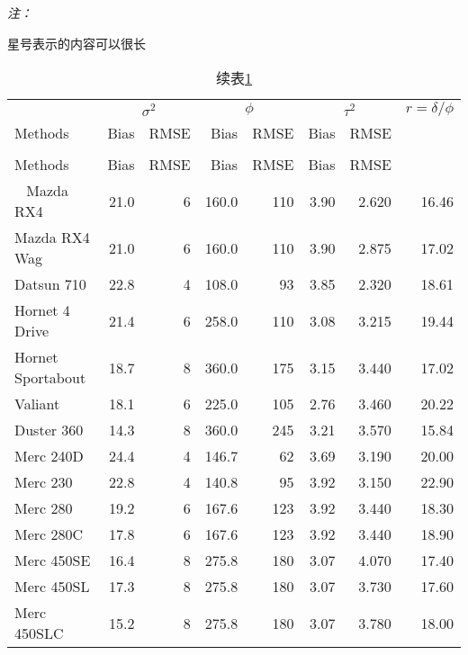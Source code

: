 \documentclass[]{book}
\begin{document}
\begin{ThreePartTable}
\begin{TableNotes}
\item \textit{注：} 
\item * 星号表示的内容可以很长
\end{TableNotes}
\begin{longtable}{lrrrrrrr}
\caption{\label{tab:kableExtra}第1种类型的统计表格样式}\\
\toprule
\multicolumn{1}{c}{ } & \multicolumn{2}{c}{$\sigma^2$} & \multicolumn{2}{c}{$\phi$} & \multicolumn{2}{c}{$\tau^2$} & \multicolumn{1}{c}{$r=\delta/\phi$} \\
\cmidrule(l{3pt}r{3pt}){2-3} \cmidrule(l{3pt}r{3pt}){4-5} \cmidrule(l{3pt}r{3pt}){6-7} \cmidrule(l{3pt}r{3pt}){8-8}
Methods & Bias & RMSE & Bias & RMSE & Bias & RMSE & \\
\midrule
\endfirsthead
\caption[]{续表\ref{tab:kableExtra}}\\
\toprule
Methods & Bias & RMSE & Bias & RMSE & Bias & RMSE & \\
\midrule
\endhead
\
\endfoot
\bottomrule
\insertTableNotes
\endlastfoot
Mazda RX4 & 21.0 & 6 & 160.0 & 110 & 3.90 & 2.620 & 16.46\\
Mazda RX4 Wag & 21.0 & 6 & 160.0 & 110 & 3.90 & 2.875 & 17.02\\
Datsun 710 & 22.8 & 4 & 108.0 & 93 & 3.85 & 2.320 & 18.61\\
Hornet 4 Drive & 21.4 & 6 & 258.0 & 110 & 3.08 & 3.215 & 19.44\\
Hornet Sportabout & 18.7 & 8 & 360.0 & 175 & 3.15 & 3.440 & 17.02\\
Valiant & 18.1 & 6 & 225.0 & 105 & 2.76 & 3.460 & 20.22\\
\midrule
Duster 360 & 14.3 & 8 & 360.0 & 245 & 3.21 & 3.570 & 15.84\\
Merc 240D & 24.4 & 4 & 146.7 & 62 & 3.69 & 3.190 & 20.00\\
Merc 230 & 22.8 & 4 & 140.8 & 95 & 3.92 & 3.150 & 22.90\\
Merc 280 & 19.2 & 6 & 167.6 & 123 & 3.92 & 3.440 & 18.30\\
Merc 280C & 17.8 & 6 & 167.6 & 123 & 3.92 & 3.440 & 18.90\\
Merc 450SE & 16.4 & 8 & 275.8 & 180 & 3.07 & 4.070 & 17.40\\
\midrule
Merc 450SL & 17.3 & 8 & 275.8 & 180 & 3.07 & 3.730 & 17.60\\
Merc 450SLC & 15.2 & 8 & 275.8 & 180 & 3.07 & 3.780 & 18.00\\

\end{longtable}
\end{ThreePartTable}
\end{document}
